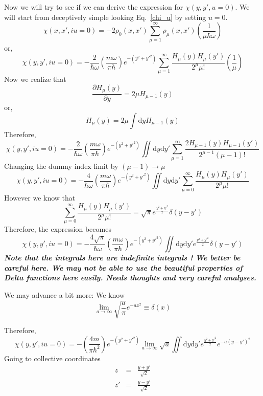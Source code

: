 \documentclass[jcp,groupaddress]{revtex4-1}
\newcommand{\eq}{\begin{equation}}
\newcommand{\qe}{\end{equation}}
\newcommand{\diff}{\mathrm{d}}
\newcommand{\fact}[1]{#1!}
\begin{document}
Now we will try to see if we can derive the expression for $\chi(y, y', u=0)$. We will start from deceptively simple looking Eq.~\eqref{chi_u} by setting $u = 0$.
\eq\label{chi_u0}
 \chi(x, x', i u=0)= -2\rho_{0}(x, x') \sum_{\mu=1}^{\infty}\rho_{\mu}(x, x')\left( \frac{1}{\mu \hbar \omega} \right)
\qe
or, 
\eq\label{chi_u0_full}
 \chi(y, y', i u=0)= -\frac{2}{\hbar \omega}\left( \frac{m \omega}{\pi \hbar}\right) e^{-(y^2+{y'}^2)} \sum_{\mu=1}^{\infty}\frac{H_{\mu}(y)H_{\mu}(y')}{2^{\mu}\fact{\mu}}\left( \frac{1}{\mu} \right)
\qe
Now we realize that 
\eq
\frac{\partial H_{\mu}(y)}{\partial y} = 2 \mu H_{\mu-1}(y)
\qe
or,
\eq
H_{\mu}(y) = 2\mu \int \diff y H_{\mu - 1}(y)
\qe
Therefore, 
\eq\label{chi_u0_wint}
 \chi(y, y', i u=0)= -\frac{2}{\hbar \omega}\left( \frac{m \omega}{\pi \hbar}\right) e^{-(y^2+{y'}^2)} \iint \diff y \diff y' \sum_{\mu=1}^{\infty}\frac{2 H_{\mu-1}(y)H_{\mu-1}(y')}{2^{\mu-1}\fact{(\mu-1)}}
\qe
Changing the dummy index limit by $(\mu -1) \rightarrow \mu$
\eq\label{chi_u0_wint2}
 \chi(y, y', i u=0)= -\frac{4}{\hbar \omega}\left( \frac{m \omega}{\pi \hbar}\right) e^{-(y^2+{y'}^2)} \iint \diff y \diff y' \sum_{\mu=0}^{\infty}\frac{H_{\mu}(y)H_{\mu}(y')}{2^{\mu}\fact{\mu}}
\qe
However we know that 
\eq
\sum_{\mu=0}^{\infty}\frac{H_{\mu}(y)H_{\mu}(y')}{2^{\mu}\fact{\mu}} =\sqrt{\pi}  e^{\frac{y^2+{y'}^2}{2}}\delta(y-y')
\qe
Therefore, the expression becomes 
\eq\label{chi_u0_wint3}
 \chi(y, y', i u=0)= -\frac{4\sqrt{\pi}}{\hbar \omega}\left( \frac{m \omega}{\pi \hbar}\right) e^{-(y^2+{y'}^2)} \iint \diff y \diff y' e^{\frac{y^2+{y'}^2}{2}}\delta(y-y')
\qe
\textbf{\emph{Note that the integrals here are indefinite integrals ! We better be careful here. We may not be able to use the beautiful properties of Delta functions here easily. Needs thoughts and very careful analyses. }}

We may advance a bit more: We know
\eq
\lim_{a \to \infty}\sqrt{\frac{a}{\pi}}e^{-a x^2} \equiv \delta(x)
\qe

Therefore, 
\eq
\chi(y, y', i u=0)= -\left( \frac{4m}{\pi \hbar^2}\right) e^{-(y^2+{y'}^2)} \lim_{a \to \infty} \sqrt{a} \iint \diff y \diff y' e^{\frac{y^2+{y'}^2}{2}}e^{-a(y-y')^2}
\qe
Going to collective coordinates
\begin{eqnarray}\label{collcoord_y}
z &=& \frac{y+y'}{\sqrt{2}}\\
z' &=&  \frac{y-y'}{\sqrt{2}}
\end{eqnarray}

\end{document}
